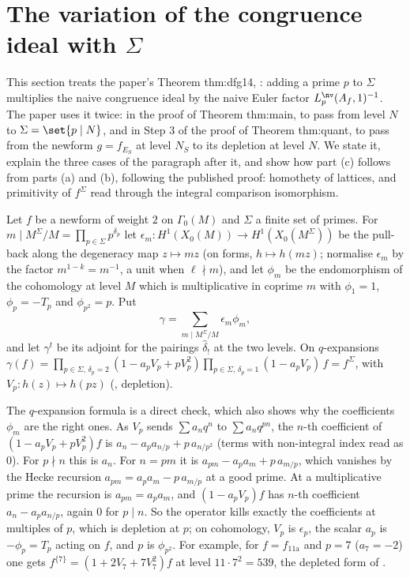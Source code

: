 \section{The variation of the congruence ideal with $\Sigma$}\label{sec:congruence:dfg14}

This section treats the paper's Theorem thm:dfg14, \cite[Proposition 1.4(c)]{DFG04}: adding a prime $p$ to $\Sigma$ multiplies the naive congruence ideal by the naive Euler
factor $L^{\nv}_p(A_f,1)^{-1}$. The paper uses it twice: in the proof of Theorem thm:main, to pass from level $N$ to $\Sigma=\set{p\mid N}$, and in Step 3 of the proof of Theorem
thm:quant, to pass from the newform $g=f_{E_S}$ at level $N_S$ to its depletion at level $N$. We state it, explain the three cases of the paragraph after it, and show
how part (c) follows from parts (a) and (b), following the published proof: homothety of lattices, and primitivity of $f^\Sigma$ read through the integral comparison isomorphism.

\begin{definition}\label{def:congruence:gamma}
Let $f$ be a newform of weight $2$ on $\Gamma_0(M)$ and $\Sigma$ a finite set of primes. For $m\mid M^\Sigma/M=\prod_{p\in\Sigma}p^{\delta_p}$ let $\epsilon_m\colon H^1(X_0(M))\to H^1(X_0(M^\Sigma))$ be the
pull-back along the degeneracy map $z\mapsto mz$ (on forms, $h\mapsto h(mz)$; \cite[Section 1.7.3]{DFG04} normalise $\epsilon_m$ by the factor $m^{1-k}=m^{-1}$, a unit when $\ell\nmid m$), and let $\phi_m$ be the endomorphism of the
cohomology at level $M$ which is multiplicative in coprime $m$ with $\phi_1=1$, $\phi_p=-T_p$ and $\phi_{p^2}=p$. Put
\[
\gamma=\sum_{m\mid M^\Sigma/M}\epsilon_m\phi_m,
\]
and let $\gamma^t$ be its adjoint for the pairings $\hat\delta_!$ at the two levels. On $q$-expansions $\gamma(f)=\prod_{p\in\Sigma,\,\delta_p=2}(1-a_pV_p+pV_p^2)\prod_{p\in\Sigma,\,\delta_p=1}(1-a_pV_p)\,f=f^\Sigma$,
with $V_p\colon h(z)\mapsto h(pz)$ (, depletion).
\end{definition}

The $q$-expansion formula is a direct check, which also shows why the coefficients $\phi_m$ are the right ones. As $V_p$ sends $\sum a_nq^n$ to $\sum a_nq^{pn}$, the $n$-th coefficient of
$(1-a_pV_p+pV_p^2)f$ is $a_n-a_pa_{n/p}+p\,a_{n/p^2}$ (terms with non-integral index read as $0$). For $p\nmid n$ this is $a_n$. For $n=pm$ it is $a_{pm}-a_pa_m+p\,a_{m/p}$, which vanishes by the Hecke
recursion $a_{pm}=a_pa_m-p\,a_{m/p}$ at a good prime. At a multiplicative prime the recursion is $a_{pm}=a_pa_m$, and $(1-a_pV_p)f$ has $n$-th coefficient $a_n-a_pa_{n/p}$, again $0$ for $p\mid n$. So
the operator kills exactly the coefficients at multiples of $p$, which is depletion at $p$; on cohomology, $V_p$ is $\epsilon_p$, the scalar $a_p$ is $-\phi_p=T_p$ acting on $f$, and $p$ is $\phi_{p^2}$.
For example, for $f=f_{\text{11a}}$ and $p=7$ ($a_7=-2$) one gets $f^{\{7\}}=(1+2V_7+7V_7^2)f$ at level $11\cdot7^2=539$, the depleted form of .

